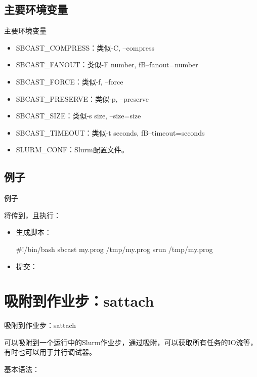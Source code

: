 \subsection{主要环境变量}
\begin{frame}{主要环境变量}
\begin{itemize}
	\item SBCAST\_COMPRESS：类似-C, --compress
    \item SBCAST\_FANOUT：类似-F number, fB--fanout=number
    \item SBCAST\_FORCE：类似-f, --force
    \item SBCAST\_PRESERVE：类似-p, --preserve
    \item SBCAST\_SIZE：类似-s size, --size=size
    \item SBCAST\_TIMEOUT：类似-t seconds, fB--timeout=seconds
    \item SLURM\_CONF：Slurm配置文件。
\end{itemize}
\end{frame}

\subsection{例子}
\begin{frame}[fragile]{例子}

将传到，且执行：

\begin{itemize}
	\item 生成脚本：
\begin{SH}
#!/bin/bash
sbcast my.prog /tmp/my.prog
srun /tmp/my.prog
\end{SH}
	\item 提交：

\end{itemize}
\end{frame}

\section{吸附到作业步：sattach}
\begin{frame}{吸附到作业步：sattach}

可以吸附到一个运行中的Slurm作业步，通过吸附，可以获取所有任务的IO流等，有时也可以用于并行调试器。

基本语法：
\end{frame}

